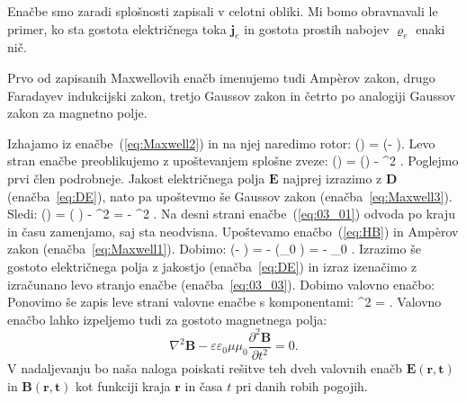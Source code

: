 Enačbe smo zaradi splošnosti zapisali v celotni obliki. Mi bomo 
obravnavali le primer, ko sta gostota električnega toka $\mathbf{j}_e$ in 
gostota prostih nabojev $\varrho_e$ enaki nič.  

\begin{remark}
Prvo od zapisanih Maxwellovih enačb imenujemo tudi Amp\`{e}rov zakon,
drugo Faradayev indukcijski zakon,
tretjo Gaussov zakon in četrto po analogiji Gaussov zakon za magnetno polje.
\end{remark}

Izhajamo iz enačbe~(\ref{eq:Maxwell2}) in na njej naredimo rotor:
\beq
\nabla \times \left(\nabla\times{}\right) =
\nabla \times \left(- \right)\!\!.
\label{eq:03_01}
\eeq
Levo stran enačbe preoblikujemo z upoštevanjem splošne zveze:
\beq
\nabla \times (\nabla \times {}) = \nabla (\nabla \cdot {}) - \nabla^2 .
\label{eq:03_02}
\eeq
Poglejmo prvi člen podrobneje. Jakost električnega polja $\mathbf{E}$ najprej  
izrazimo z $\mathbf{D}$ (enačba~\ref{eq:DE}), nato pa upoštevmo še Gaussov zakon 
(enačba~\ref{eq:Maxwell3}). Sledi:
\beq
\nabla \times (\nabla \times {}) = \nabla \left(\nabla \cdot 
{}\right) - \nabla^2  = - \nabla^2 .
\label{eq:03_03}
\eeq
Na desni strani enačbe~(\ref{eq:03_01}) odvoda po kraju in času zamenjamo, 
saj sta neodvisna. Upoštevamo enačbo~(\ref{eq:HB}) in Amp\`{e}rov zakon (enačba~\ref{eq:Maxwell1}). Dobimo:
\beq
\nabla \times \left(- \right) = 
- \left(\mu \mu_0 \nabla
\times {}\right) = - \mu \mu_0 .
\label{eq:03_04}
\eeq
Izrazimo še gostoto električnega polja z jakostjo (enačba~\ref{eq:DE}) in izraz izenačimo z 
izračunano levo stranjo enačbe (enačba~\ref{eq:03_03}). Dobimo valovno enačbo:
Ponovimo še zapis leve strani valovne enačbe s komponentami:
\beq
\nabla^2  =  
\!\!.
\label{eq:03_05}
\eeq
Valovno enačbo lahko izpeljemo tudi za gostoto magnetnega polja:
\begin{equation}
\nabla^2\mathbf{B} - \varepsilon \varepsilon_0 \mu \mu_0 \frac{\partial^2 \mathbf{B}}{\partial t^2} = 0.
\label{eq:valovnaB}
\end{equation}
V nadaljevanju bo naša naloga poiskati rešitve teh dveh valovnih enačb $\mathbf{E(\mathbf{r},t)}$
in $\mathbf{B(\mathbf{r},t)}$ kot funkciji kraja $\mathbf{r}$ in časa $t$ pri danih robih pogojih.


